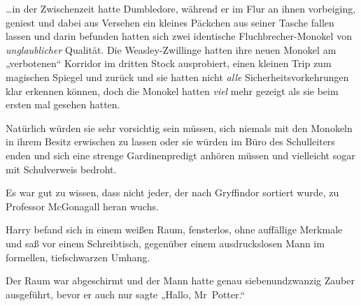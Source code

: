 …in der Zwischenzeit hatte Dumbledore, während er im Flur an ihnen vorbeiging, geniest und dabei aus Versehen ein kleines Päckchen aus seiner Tasche fallen lassen und darin befunden hatten sich zwei identische Fluchbrecher-Monokel von \emph{unglaublicher} Qualität. Die Weasley-Zwillinge hatten ihre neuen Monokel am „verbotenen“ Korridor im dritten Stock ausprobiert, einen kleinen Trip zum magischen Spiegel und zurück und sie hatten nicht \emph{alle} Sicherheitsvorkehrungen klar erkennen können, doch die Monokel hatten \emph{viel} mehr gezeigt als sie beim ersten mal gesehen hatten.

Natürlich würden sie sehr vorsichtig sein müssen, sich niemals mit den Monokeln in ihrem Besitz erwischen zu lassen oder sie würden im Büro des Schulleiters enden und sich eine strenge Gardinenpredigt anhören müssen und vielleicht sogar mit Schulverweis bedroht.

Es war gut zu wissen, dass nicht jeder, der nach Gryffindor sortiert wurde, zu Professor McGonagall heran wuchs.

\later

Harry befand sich in einem weißen Raum, fensterlos, ohne auffällige Merkmale und saß vor einem Schreibtisch, gegenüber einem ausdruckslosen Mann im formellen, tiefschwarzen Umhang.

Der Raum war abgeschirmt und der Mann hatte genau siebenundzwanzig Zauber ausgeführt, bevor er auch nur sagte „Hallo, Mr~Potter.“


